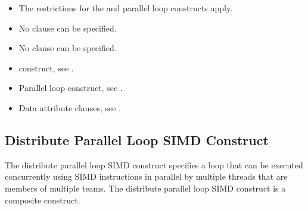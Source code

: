 {{{{%
\vspace{-6pt}

\restrictions
\begin{itemize}
\item The restrictions for the  and parallel loop constructs apply.
\item No  clause can be specified.
\item No  clause can be specified.
\end{itemize}

\vspace{-6pt}

\crossreferences
\begin{itemize}
\item {} construct, see 
.

\item Parallel loop construct, see 
.

\item Data attribute clauses, see 
.
\end{itemize}






\vspace{-24pt}

\subsection{Distribute Parallel Loop SIMD Construct}
\label{subsec:Distribute Parallel Loop SIMD Construct}
\summary
The distribute parallel loop SIMD construct specifies a loop that can be executed 
concurrently using SIMD instructions in parallel by multiple threads that are members 
of multiple teams. The distribute parallel loop SIMD construct is a composite construct.

}}}}
